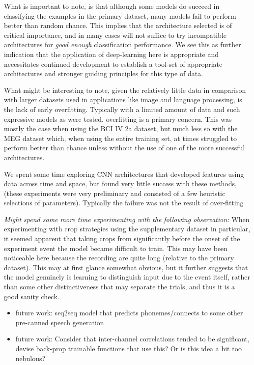 \documentclass[utf8]{frontiersSCNS} %
\begin{document}

What is important to note, is that although some models do succeed in classifying the examples in the primary dataset, many models fail to perform better than random chance. This implies that the architecture selected is of critical importance, and in many cases will not suffice to try incompatible architectures for {\em good enough} classification performance. We see this as further indication that the application of deep-learning here is appropriate and necessitates continued development to establish a tool-set of appropriate architectures and stronger guiding principles for this type of data.

What might be interesting to note, given the relatively little data in comparison with larger datasets used in applications like image and language processing, is the lack of early overfitting. Typically with a limited amount of data and such expressive models as were tested, overfitting is a primary concern. This was mostly the case when using the BCI IV 2a dataset, but much less so with the MEG dataset which, when using the entire training set, at times struggled to perform better than chance unless without the use of one of the more successful architectures.

We spent some time exploring CNN architectures that developed features using data across time and space, but found very little success with these methods, (these experiments were very preliminary and consisted of a few heuristic selections of parameters). Typically the failure was not the result of over-fitting

{\em Might spend some more time experimenting with the following observation:} When experimenting with crop strategies using the supplementary dataset in particular, it seemed apparent that taking crops from significantly before the onset of the experiment event the model became difficult to train. This may have been noticeable here because the recording are quite long (relative to the primary dataset). This may at first glance somewhat obvious, but it further suggests that the model genuinely is learning to distinguish input due to the event itself, rather than some other distinctiveness that may separate the trials, and thus it is a good sanity check.

\begin{itemize}
\item future work: seq2seq model that predicts phonemes/connects to some other pre-canned speech generation
\item future work: Consider that inter-channel correlations tended to be significant, devise back-prop trainable functions that use this? Or is this idea a bit too nebulous?
\end{itemize}
\end{document}
